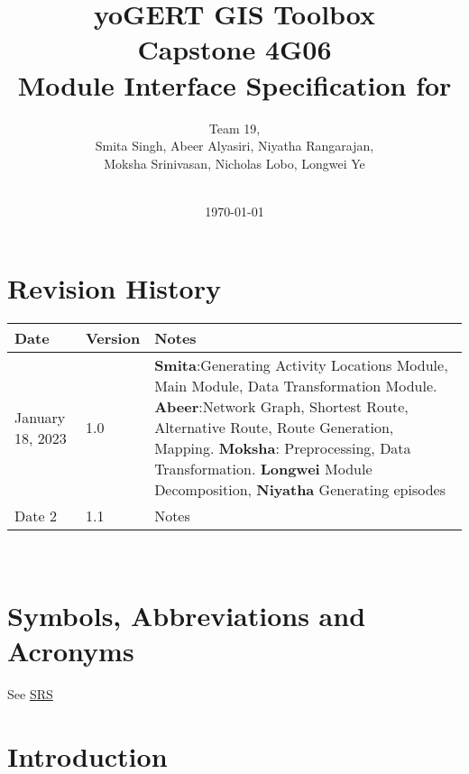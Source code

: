 \documentclass[12pt, titlepage]{article}
\begin{document}
\title{\textbf{yoGERT GIS Toolbox}\\ Capstone 4G06\\Module Interface Specification for }

\author{Team 19,
		\\ Smita Singh, Abeer Alyasiri, Niyatha Rangarajan,\\ Moksha Srinivasan, Nicholas Lobo, Longwei Ye \\\\
}

\date{\today}

\maketitle


\section{Revision History}

\begin{tabularx}{\textwidth}{p{3cm}p{2cm}X}
\toprule {\bf Date} & {\bf Version} & {\bf Notes}\\
\midrule
January 18, 2023 & 1.0 & \textbf{Smita}:Generating Activity Locations Module, Main Module, Data Transformation Module. \textbf{Abeer}:Network Graph, Shortest Route, Alternative Route, Route Generation, Mapping. \textbf{Moksha}: Preprocessing, Data Transformation. \textbf{Longwei} Module Decomposition, \textbf{Niyatha} Generating episodes \\
Date 2 & 1.1 & Notes\\
\bottomrule
\end{tabularx}

~\newpage

\section{Symbols, Abbreviations and Acronyms}

See \href{https://github.com/NicLobo/Capstone-yoGERT/blob/main/docs/SRS/SRS.pdf}{SRS} 

\newpage

\tableofcontents

\newpage


\section{Introduction}
\end{document}
